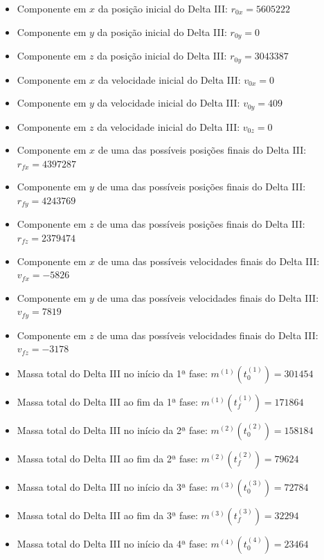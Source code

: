 \begin{itemize}
	\item Componente em $ x $ da posição inicial do Delta III: $ r_{0x} = 5605222 $ 
	\item Componente em $ y $ da posição inicial do Delta III: $ r_{0y} = 0 $ 
	\item Componente em $ z $ da posição inicial do Delta III: $ r_{0y} = 3043387 $ 
	\item Componente em $ x $ da velocidade inicial do Delta III: $ v_{0x} = 0 $ 
	\item Componente em $ y $ da velocidade inicial do Delta III: $ v_{0y} = 409 $ 
	\item Componente em $ z $ da velocidade inicial do Delta III: $ v_{0z} = 0 $ 
	\item Componente em $ x $ de uma das possíveis posições finais do Delta III: $ r_{fx} = 4397287 $ 
	\item Componente em $ y $ de uma das possíveis posições finais do Delta III: $ r_{fy} = 4243769 $ 
	\item Componente em $ z $ de uma das possíveis posições finais do Delta III: $ r_{fz} = 2379474 $ 
	\item Componente em $ x $ de uma das possíveis velocidades finais do Delta III: $ v_{fx} = -5826 $ 
	\item Componente em $ y $ de uma das possíveis velocidades finais do Delta III: $ v_{fy} = 7819 $ 
	\item Componente em $ z $ de uma das possíveis velocidades finais do Delta III: $ v_{fz} = -3178$ 
	\item Massa total do Delta III no início da 1ª fase: $ m^{(1)} \left( t_0^{(1)} \right) = 301454$ 
	\item Massa total do Delta III ao fim da 1ª fase: $ m^{(1)} \left( t_f^{(1)} \right) = 171864$ 
	\item Massa total do Delta III no início da 2ª fase: $ m^{(2)} \left( t_0^{(2)} \right) = 158184$ 
	\item Massa total do Delta III ao fim da 2ª fase: $ m^{(2)} \left( t_f^{(2)} \right) = 79624$ 
	\item Massa total do Delta III no início da 3ª fase: $ m^{(3)} \left( t_0^{(3)} \right) = 72784$ 
	\item Massa total do Delta III ao fim da 3ª fase: $ m^{(3)} \left( t_f^{(3)} \right) = 32294$ 
	\item Massa total do Delta III no início da 4ª fase: $ m^{(4)} \left( t_0^{(4)} \right) = 23464$ 

\end{itemize}

